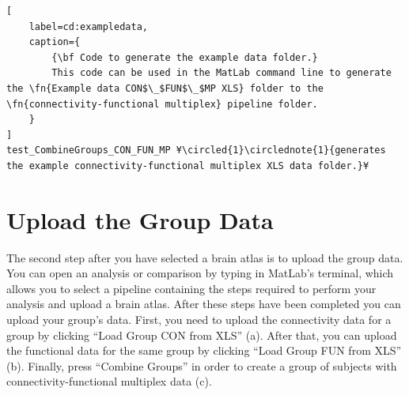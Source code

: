 \documentclass[justified]{tufte-handout}
\begin{document}
\begin{lstlisting}[
	label=cd:exampledata,
	caption={
		{\bf Code to generate the example data folder.}
		This code can be used in the MatLab command line to generate the \fn{Example data CON$\_$FUN$\_$MP XLS} folder to the \fn{connectivity-functional multiplex} pipeline folder.
	}
]
test_CombineGroups_CON_FUN_MP ¥\circled{1}\circlednote{1}{generates the example connectivity-functional multiplex XLS data folder.}¥
\end{lstlisting}

\section{Upload the Group Data}

The second step after you have selected a brain atlas is to upload the group data. You can open an analysis or comparison by typing  in MatLab's terminal, which allows you to select a pipeline containing the steps required to perform your analysis and upload a brain atlas. After these steps have been completed you can upload your group's data. First, you need to upload the connectivity data for a group by clicking ``Load Group CON from XLS'' (a). After that, you can upload the functional data for the same group by clicking ``Load Group FUN from XLS'' (b). Finally, press ``Combine Groups'' in order to create a group of subjects with connectivity-functional multiplex data (c).
\end{document}
